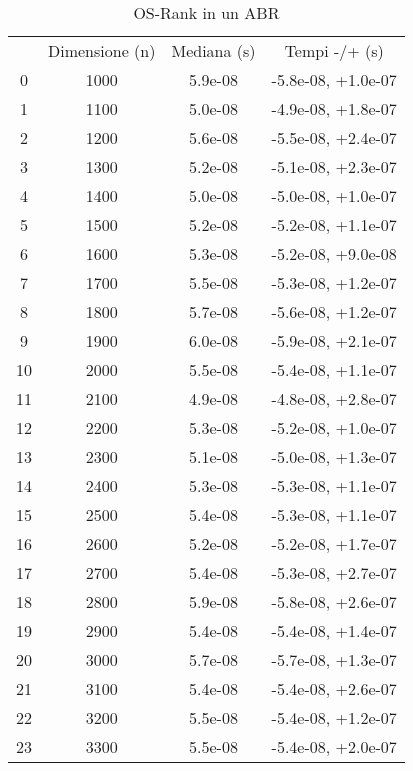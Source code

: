 \begin{table}
\centering
\caption{OS-Rank in un ABR}
\label{OS-Rank in un ABR}
\begin{adjustbox}{width=1\textwidth/2}
\begin{tabular}{|c|c|c|c|}
\hline
 & Dimensione (n) & Mediana (s) & Tempi -/+ (s) \\
0 & 1000 & 5.9e-08 & -5.8e-08, +1.0e-07 \\
\cline{1-4}
1 & 1100 & 5.0e-08 & -4.9e-08, +1.8e-07 \\
\cline{1-4}
2 & 1200 & 5.6e-08 & -5.5e-08, +2.4e-07 \\
\cline{1-4}
3 & 1300 & 5.2e-08 & -5.1e-08, +2.3e-07 \\
\cline{1-4}
4 & 1400 & 5.0e-08 & -5.0e-08, +1.0e-07 \\
\cline{1-4}
5 & 1500 & 5.2e-08 & -5.2e-08, +1.1e-07 \\
\cline{1-4}
6 & 1600 & 5.3e-08 & -5.2e-08, +9.0e-08 \\
\cline{1-4}
7 & 1700 & 5.5e-08 & -5.3e-08, +1.2e-07 \\
\cline{1-4}
8 & 1800 & 5.7e-08 & -5.6e-08, +1.2e-07 \\
\cline{1-4}
9 & 1900 & 6.0e-08 & -5.9e-08, +2.1e-07 \\
\cline{1-4}
10 & 2000 & 5.5e-08 & -5.4e-08, +1.1e-07 \\
\cline{1-4}
11 & 2100 & 4.9e-08 & -4.8e-08, +2.8e-07 \\
\cline{1-4}
12 & 2200 & 5.3e-08 & -5.2e-08, +1.0e-07 \\
\cline{1-4}
13 & 2300 & 5.1e-08 & -5.0e-08, +1.3e-07 \\
\cline{1-4}
14 & 2400 & 5.3e-08 & -5.3e-08, +1.1e-07 \\
\cline{1-4}
15 & 2500 & 5.4e-08 & -5.3e-08, +1.1e-07 \\
\cline{1-4}
16 & 2600 & 5.2e-08 & -5.2e-08, +1.7e-07 \\
\cline{1-4}
17 & 2700 & 5.4e-08 & -5.3e-08, +2.7e-07 \\
\cline{1-4}
18 & 2800 & 5.9e-08 & -5.8e-08, +2.6e-07 \\
\cline{1-4}
19 & 2900 & 5.4e-08 & -5.4e-08, +1.4e-07 \\
\cline{1-4}
20 & 3000 & 5.7e-08 & -5.7e-08, +1.3e-07 \\
\cline{1-4}
21 & 3100 & 5.4e-08 & -5.4e-08, +2.6e-07 \\
\cline{1-4}
22 & 3200 & 5.5e-08 & -5.4e-08, +1.2e-07 \\
\cline{1-4}
23 & 3300 & 5.5e-08 & -5.4e-08, +2.0e-07 \\

\end{tabular}
\end{adjustbox}
\end{table}
